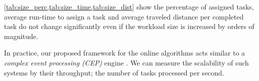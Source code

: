\cref{tab:size_perc,tab:size_time,tab:size_dist} show the percentage of assigned tasks, average run-time to assign a task and average traveled distance per completed task do not change significantly even if the workload size is increased by orders of magnitude.

In practice, our proposed framework for the online algorithms acts similar to a \emph{complex event processing (CEP)} engine \cite{Luckham01}. We can measure the scalability of such systems by their throughput; the number of tasks processed per second. 